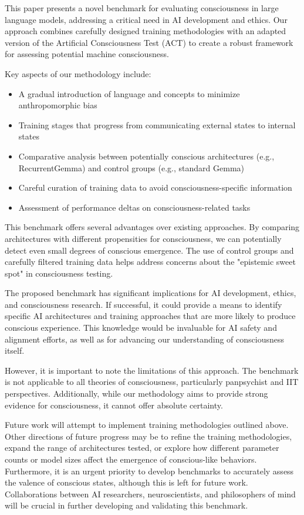 \documentclass{article}
\begin{document}
This paper presents a novel benchmark for evaluating consciousness in large language models, addressing a critical need in AI development and ethics. Our approach combines carefully designed training methodologies with an adapted version of the Artificial Consciousness Test (ACT) to create a robust framework for assessing potential machine consciousness.

Key aspects of our methodology include:
\begin{itemize}
    \item A gradual introduction of language and concepts to minimize anthropomorphic bias
    \item Training stages that progress from communicating external states to internal states
    \item Comparative analysis between potentially conscious architectures (e.g., RecurrentGemma) and control groups (e.g., standard Gemma)
    \item Careful curation of training data to avoid consciousness-specific information
    \item Assessment of performance deltas on consciousness-related tasks
\end{itemize}

This benchmark offers several advantages over existing approaches. By comparing architectures with different propensities for consciousness, we can potentially detect even small degrees of conscious emergence. The use of control groups and carefully filtered training data helps address concerns about the "epistemic sweet spot" in consciousness testing.

The proposed benchmark has significant implications for AI development, ethics, and consciousness research. If successful, it could provide a means to identify specific AI architectures and training approaches that are more likely to produce conscious experience. This knowledge would be invaluable for AI safety and alignment efforts, as well as for advancing our understanding of consciousness itself.

However, it is important to note the limitations of this approach. The benchmark is not applicable to all theories of consciousness, particularly panpsychist and IIT perspectives. Additionally, while our methodology aims to provide strong evidence for consciousness, it cannot offer absolute certainty.

Future work will attempt to implement training methodologies outlined above. Other directions of future progress may be to refine the training methodologies, expand the range of architectures tested, or explore how different parameter counts or model sizes affect the emergence of conscious-like behaviors. Furthermore, it is an urgent priority to develop benchmarks to accurately assess the valence of conscious states, although this is left for future work. Collaborations between AI researchers, neuroscientists, and philosophers of mind will be crucial in further developing and validating this benchmark.
\end{document}
